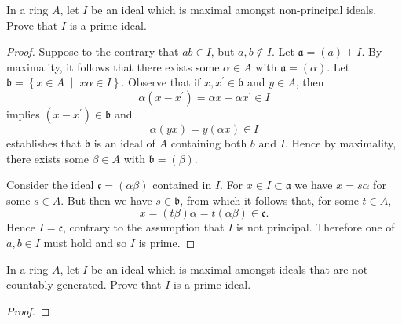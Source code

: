 \documentclass[10pt]{amsart}
\begin{document}
\begin{thm}
  In a ring $A$, let $I$ be an ideal which is maximal amongst non-principal ideals.
  Prove that $I$ is a prime ideal.
  
  \begin{proof}
    Suppose to the contrary that $ab \in I$, but $a,b \not \in I$.
    Let $\mathfrak{a} = (a) + I$.
    By maximality, it follows that there exists some $\alpha \in A$ with $\mathfrak{a} = (\alpha)$.
    Let $\mathfrak{b} = \left\{x \in A \;\middle\vert\; x\alpha \in I \right\}$.
    Observe that if $x, x^\prime \in \mathfrak{b}$ and $y \in A$, then
    $$\alpha(x - x^\prime) = \alpha x - \alpha x^\prime \in I$$
    implies $(x - x^\prime) \in\mathfrak{b}$ and    
    $$\alpha(yx) = y(\alpha x) \in I$$
    establishes that $\mathfrak{b}$ is an ideal of $A$ containing both $b$ and $I$.
    Hence by maximality, there exists some $\beta \in A$ with $\mathfrak{b} = (\beta)$.
    
    Consider the ideal $\mathfrak{c} = (\alpha\beta)$ contained in $I$.
    For $x \in I \subset \mathfrak{a}$ we have $x = s\alpha$ for some $s \in A$.
    But then we have $s \in \mathfrak{b}$, from which it follows that, for some $t \in A$,
    $$x = (t\beta)\alpha = t(\alpha\beta) \in \mathfrak{c}.$$
    Hence $I = \mathfrak{c}$, contrary to the assumption that $I$ is not principal.
    Therefore one of $a, b \in I$ must hold and so $I$ is prime.

  \end{proof}
\end{thm}

\begin{thm}
  In a ring $A$, let $I$ be an ideal which is maximal amongst ideals that are not countably generated.
  Prove that $I$ is a prime ideal.
  
  \begin{proof}
  \end{proof}
\end{thm}
\end{document}

